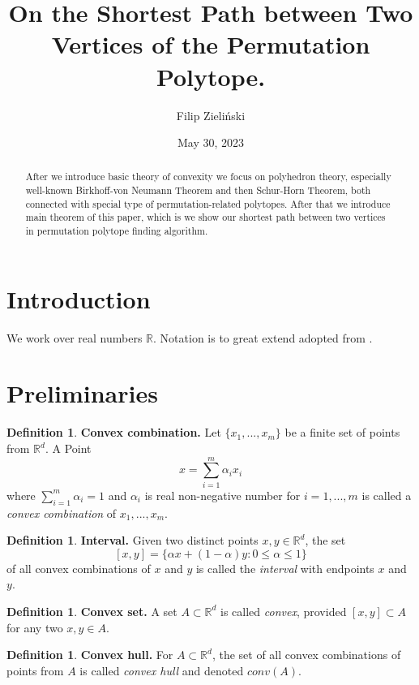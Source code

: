 \documentclass[11pt]{article}
\theoremstyle{plain}
\theoremstyle{definition}
\newtheorem{definition}[thm]{Definition}
\renewcommand\leq{\leqslant}
\begin{document}
\title{On the Shortest Path between Two Vertices of the Permutation Polytope.}
\author{Filip Zieli\'nski}
\date{May 30, 2023}
\maketitle
\thispagestyle{empty}
\begin{abstract}
After we introduce basic theory of convexity we focus on polyhedron theory, especially well-known Birkhoff-von Neumann Theorem and then Schur-Horn Theorem, both connected with special type of permutation-related polytopes. After that we introduce main theorem of this paper, which is we show our shortest path between two vertices in permutation polytope  finding algorithm. 
\end{abstract}
\section*{Introduction}
We work over real numbers $\mathbb{R}$. Notation is to great extend adopted from \cite{Convexity}.
\section{Preliminaries}
\begin{definition}
    \textbf{Convex combination.}
    Let $\{ x_{1},...,x_{m} \}$ be a finite set of points from $\mathbb{R}^d$. A Point
    $$x = \sum_{i=1}^m \alpha_{i}x_{i}$$ where $ \sum_{i=1}^m \alpha_{i} = 1$ and $\alpha_{i}$ is real non-negative number for $i=1,...,m$
    is called a \textit{convex combination} of $x_{1},...,x_{m}$.
\end{definition}
\begin{definition}
    \textbf{Interval.}
    Given two distinct points $x,y \in \mathbb{R}^d$, the set
    $$[x,y] = \{ \alpha x + (1-\alpha) y : 0\leq \alpha \leq 1 \}$$ 
    of all convex combinations of $x$ and $y$ is called the \textit{interval} with endpoints $x$ and $y$.  
\end{definition}
\begin{definition}
    \textbf{Convex set.}
    A set $A \subset \mathbb{R}^d$ is called \textit{convex}, provided $[x,y] \subset A$ for any two $x,y \in A.$
\end{definition}
\begin{definition}
    \textbf{Convex hull.}
    For $A \subset \mathbb{R}^d$, the set of all convex combinations of points from $A$ is called \textit{convex hull} and denoted $conv(A)$.
\end{definition}
\end{document}
